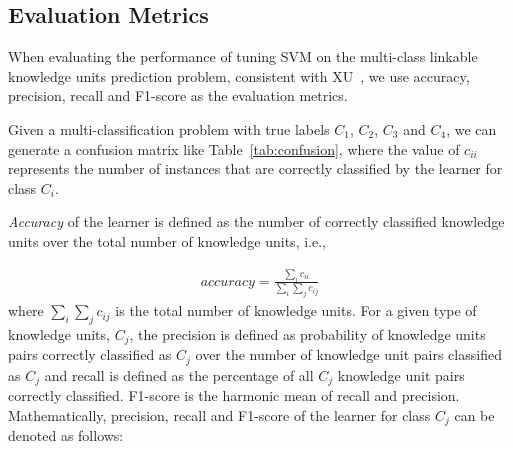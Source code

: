 \documentclass[sigconf]{acmart}
\theoremstyle{break}
\newcommand{\tab}[1]{Table~\ref{tab:#1}}
\begin{document}
\subsection{Evaluation Metrics}

\begin{table}[htp]
\caption {Confusion Matrix.}
\scriptsize
{}

\label{tab:confusion}
\end{table}

When evaluating the performance of tuning SVM on the
multi-class linkable knowledge units prediction problem,
consistent with XU~\cite{xu2016predicting}, we use accuracy, precision, recall and F1-score
as the evaluation metrics.



Given a multi-classification problem with true labels $C_1$, 
$C_2$, $C_3$ and $C_4$, we can generate a confusion matrix like \tab{confusion}, 
where the value of $c_{ii}$ represents the number of instances that are correctly classified
by the learner for class $C_i$. 

{\it Accuracy} of the learner is defined as the number of  correctly
classified knowledge units over the total number of knowledge units, i.e.,

{\[
\begin{array}{ll}
accuracy = \frac{\sum_i c_{ii}}{\sum_{i}\sum_{j}c_{ij}}
\end{array}
\]}
where ${\sum_{i}\sum_{j}c_{ij}}$ is the total number of knowledge units.
For a given type of knowledge units, $C_j$, the  precision is defined as probability of
knowledge units pairs correctly classified as $C_j$ over the number of knowledge unit pairs classified as $C_j$ and
 recall is defined as the percentage of all $C_j$ knowledge unit pairs correctly classified. F1-score is the harmonic mean of
 recall and precision. Mathematically,
  precision, recall and  F1-score of 
the learner for class $C_j$ can be denoted as follows:
\end{document}
